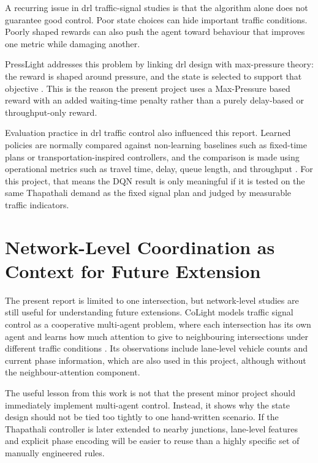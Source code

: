 A recurring issue in \gls{drl} traffic-signal studies is that the
algorithm alone does not guarantee good control. Poor state choices can
hide important traffic conditions. Poorly shaped rewards can also push
the agent toward behaviour that improves one metric while damaging
another.

PressLight addresses this problem by linking \gls{drl} design with
max-pressure theory: the reward is shaped around pressure, and the state
is selected to support that objective \cite{wei2019presslight}. This is
the reason the present project uses a Max-Pressure based reward with an
added waiting-time penalty rather than a purely delay-based or
throughput-only reward.

Evaluation practice in \gls{drl} traffic control also influenced this report. Learned policies are normally compared against non-learning baselines such as fixed-time plans or transportation-inspired controllers, and the comparison is made using operational metrics such as travel time, delay, queue length, and throughput \cite{wei2019presslight,wei2020survey}. For this project, that means the DQN result is only meaningful if it is tested on the same Thapathali demand as the fixed signal plan and judged by measurable traffic indicators.

\section{Network-Level Coordination as Context for Future Extension}
\label{sec:network_coordination}
\noindent The present report is limited to one intersection, but network-level studies are still useful for understanding future extensions. CoLight models traffic signal control as a cooperative multi-agent problem, where each intersection has its own agent and learns how much attention to give to neighbouring intersections under different traffic conditions \cite{wei2019colight}. Its observations include lane-level vehicle counts and current phase information, which are also used in this project, although without the neighbour-attention component.

The useful lesson from this work is not that the present minor project should immediately implement multi-agent control. Instead, it shows why the state design should not be tied too tightly to one hand-written scenario. If the Thapathali controller is later extended to nearby junctions, lane-level features and explicit phase encoding will be easier to reuse than a highly specific set of manually engineered rules.

